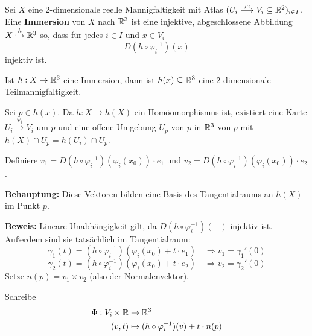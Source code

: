 \documentclass[main.tex]{subfiles}
\begin{document}
\begin{Definition}[Immersion]
  Sei $X$ eine 2-dimensionale reelle Mannigfaltigkeit mit Atlas $(U_i \stackrel{\varphi_i}{\longrightarrow} V_i \subseteq \mathbb{R}^2)_{i \in I}$. Eine \textbf{Immersion} von $X$ nach $\mathbb{R}^3$ ist eine injektive, abgeschlossene Abbildung $X \stackrel{h}{\hookrightarrow} \mathbb{R}^3$ so, dass für jedes $i \in I$ und $x \in V_i$
  $$D (h \circ \varphi_i^{-1})(x)$$
  injektiv ist.
\end{Definition}

\begin{Theorem}
  Ist $h: X \to \mathbb{R}^3$ eine Immersion, dann ist $h(x) \subseteq \mathbb{R}^3$ eine 2-dimensionale Teilmannigfaltigkeit.
\end{Theorem}

\begin{Beweis}
  Sei $p \in h(x)$. Da $h: X \to h(X)$ ein Homöomorphismus ist, existiert eine Karte $U_i \stackrel{\varphi_i}{\longrightarrow} V_i$ um $p$ und eine offene Umgebung $U_p$ von $p$ in $\mathbb{R}^3$ von $p$ mit $h(X) \cap U_p = h(U_i) \cap U_p$.

  Definiere $v_1 = D(h \circ \varphi_i^{-1})(\varphi_i(x_0))\cdot e_1$ und $v_2 = D(h \circ \varphi_i^{-1})(\varphi_i(x_0))\cdot e_2$.

  \textbf{Behauptung:} Diese Vektoren bilden eine Basis des Tangentialraums an $h(X)$ im Punkt $p$.

  \textbf{Beweis:} Lineare Unabhängigkeit gilt, da $D(h \circ \varphi_i^{-1})(-)$ injektiv ist. Außerdem sind sie tatsächlich im Tangentialraum:
  $$\gamma_1(t) = (h \circ \varphi_i^{-1})(\varphi_i(x_0) + t \cdot e_1) \quad \Rightarrow v_1 = \gamma_1'(0)$$
  $$\gamma_2(t) = (h \circ \varphi_i^{-1})(\varphi_i(x_0) + t \cdot e_2) \quad \Rightarrow v_2 = \gamma_2'(0)$$
  Setze $n(p) = v_1 \times v_2$ (also der Normalenvektor).

  Schreibe
  $$\begin{aligned}
    \Phi: V_i \times \mathbb{R} & \to \mathbb{R}^3\\
    (v,t) & \mapsto (h \circ \varphi_i^{-1})(v) + t \cdot n(p)
  \end{aligned}$$


\end{Beweis}
\end{document}
